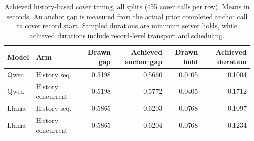 \begin{table}[t]\centering\small
\caption{Achieved history-based cover timing, all splits (455 cover calls per row). Means in seconds. An anchor gap is measured from the actual prior completed anchor call to cover record start. Sampled durations are minimum server holds, while achieved durations include record-level transport and scheduling.}
\label{tab:live-draws}
\begin{tabularx}{\textwidth}{@{}lYrrrr@{}}\toprule
Model & Arm & Drawn gap & Achieved anchor gap & Drawn hold & Achieved duration\\\midrule
Qwen & History seq. & 0.5198 & 0.5660 & 0.0405 & 0.1004\\
Qwen & History concurrent & 0.5198 & 0.5772 & 0.0405 & 0.1712\\
Llama & History seq. & 0.5865 & 0.6203 & 0.0768 & 0.1097\\
Llama & History concurrent & 0.5865 & 0.6204 & 0.0768 & 0.1234\\
\bottomrule\end{tabularx}
\end{table}
